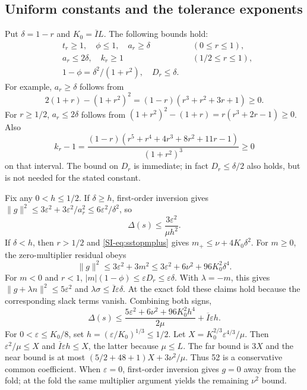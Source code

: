 \subsection{Uniform constants and the tolerance exponents}
Put $\delta=1-r$ and $K_0=\overline I L$. The following bounds hold:
\begin{equation}
 \begin{aligned}
 &t_r\ge1,\quad \phi\le1,\quad a_r\ge\delta &&(0\le r\le1),\\
 &a_r\le2\delta,\quad k_r\ge1 &&(1/2\le r\le1),\\
 &1-\phi=\delta^2/(1+r^2),\quad D_r\le\delta.
 \end{aligned}
 \label{SI-eq:sstopgeometrybounds}
\end{equation}
For example, $a_r\ge\delta$ follows from
\begin{equation*}
 2(1+r)-(1+r^2)^2=(1-r)(r^3+r^2+3r+1)\ge0.
\end{equation*}
For $r\ge1/2$, $a_r\le2\delta$ follows from $(1+r^2)^2-(1+r)=r(r^3+2r-1)\ge0$. Also
\begin{equation*}
 k_r-1=\frac{(1-r)(r^5+r^4+4r^3+8r^2+11r-1)}{(1+r^2)^3}\ge0
\end{equation*}
on that interval. The bound on $D_r$ is immediate; in fact $D_r\le\delta/2$ also holds, but is not needed for the stated constant.

Fix any $0<h\le1/2$. If $\delta\ge h$, first-order inversion gives $\|g\|^2\le3\varepsilon^2+3\varepsilon^2/a_r^2\le6\varepsilon^2/\delta^2$, so
\begin{equation}
 \Delta(s)\le\frac{3\varepsilon^2}{\mu h^2}.
 \label{SI-eq:sstopfar}
\end{equation}
If $\delta<h$, then $r>1/2$ and \eqref{SI-eq:sstopmplus} gives $m_+\le\nu+4K_0\delta^2$. For $m\ge0$, the zero-multiplier residual obeys
\begin{equation}
 \|g\|^2\le3\varepsilon^2+3m^2
 \le3\varepsilon^2+6\nu^2+96K_0^2\delta^4.
 \label{SI-eq:sstoppositive}
\end{equation}
For $m<0$ and $r<1$, $|m|(1-\phi)\le\varepsilon D_r\le\varepsilon\delta$. With $\lambda=-m$, this gives $\|g+\lambda n\|^2\le5\varepsilon^2$ and $\lambda\sigma\le\overline I\varepsilon\delta$. At the exact fold these claims hold because the corresponding slack terms vanish. Combining both signs,
\begin{equation}
 \Delta(s)\le\frac{5\varepsilon^2+6\nu^2+96K_0^2h^4}{2\mu}
                   +\overline I\varepsilon h.
 \label{SI-eq:sstopnear}
\end{equation}
For $0<\varepsilon\le K_0/8$, set $h=(\varepsilon/K_0)^{1/3}\le1/2$. Let $X=K_0^{2/3}\varepsilon^{4/3}/\mu$. Then $\varepsilon^2/\mu\le X$ and $\overline I\varepsilon h\le X$, the latter because $\mu\le L$. The far bound is $3X$ and the near bound is at most $(5/2+48+1)X+3\nu^2/\mu$. Thus 52 is a conservative common coefficient. When $\varepsilon=0$, first-order inversion gives $g=0$ away from the fold; at the fold the same multiplier argument yields the remaining $\nu^2$ bound.

